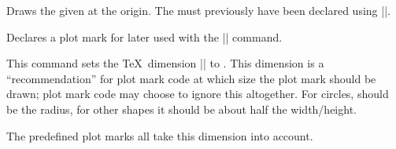 \begin{command}{\pgfuseplotmark{}}
  Draws the given  at the origin. The  must previously have been declared using
  |\pgfdeclareplotmark|. 

\begin{codeexample}[]
\end{codeexample}
\end{command}

\begin{command}{\pgfdeclareplotmark{}}
  Declares a plot mark for later used with the |\pgfuseplotmark|
  command.

\begin{codeexample}[]
  {\pgfpathcircle{\pgfpoint{0cm}{1ex}}{1ex}\pgfusepathqstroke}  
\end{codeexample}
\end{command}


\begin{command}{\pgfsetplotmarksize{}}
  This command sets the \TeX\ dimension |\pgfplotmarksize| to
  . This dimension is a ``recommendation'' for plot
  mark code at which size the plot mark should be drawn; plot mark
  code may choose to ignore this  altogether. For
  circles,  should  be the radius, for other shapes it
  should be about half the width/height.

  The predefined plot marks all take this dimension into account.

\begin{codeexample}[]
\end{codeexample}
\end{command}

